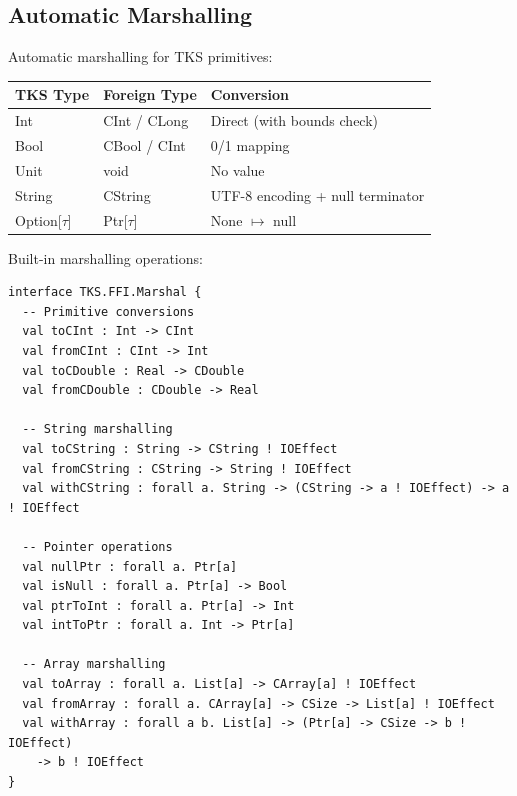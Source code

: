 \subsection{Automatic Marshalling}
\label{subsec:auto-marshalling}

\begin{definition}
\label{def:primitive-mapping}
Automatic marshalling for TKS primitives:
\begin{center}
\begin{tabular}{lll}
\toprule
\textbf{TKS Type} & \textbf{Foreign Type} & \textbf{Conversion} \\
\midrule
\textsf{Int} & \textsf{CInt} / \textsf{CLong} & Direct (with bounds check) \\
\textsf{Bool} & \textsf{CBool} / \textsf{CInt} & 0/1 mapping \\
\textsf{Unit} & \textsf{void} & No value \\
\textsf{String} & \textsf{CString} & UTF-8 encoding + null terminator \\
\textsf{Option}[$\tau$] & \textsf{Ptr}[$\tau$] & \textsf{None} $\mapsto$ null \\
\bottomrule
\end{tabular}
\end{center}
\end{definition}

\begin{definition}
\label{def:marshalling-fns}
Built-in marshalling operations:
\begin{verbatim}
interface TKS.FFI.Marshal {
  -- Primitive conversions
  val toCInt : Int -> CInt
  val fromCInt : CInt -> Int
  val toCDouble : Real -> CDouble
  val fromCDouble : CDouble -> Real

  -- String marshalling
  val toCString : String -> CString ! IOEffect
  val fromCString : CString -> String ! IOEffect
  val withCString : forall a. String -> (CString -> a ! IOEffect) -> a ! IOEffect

  -- Pointer operations
  val nullPtr : forall a. Ptr[a]
  val isNull : forall a. Ptr[a] -> Bool
  val ptrToInt : forall a. Ptr[a] -> Int
  val intToPtr : forall a. Int -> Ptr[a]

  -- Array marshalling
  val toArray : forall a. List[a] -> CArray[a] ! IOEffect
  val fromArray : forall a. CArray[a] -> CSize -> List[a] ! IOEffect
  val withArray : forall a b. List[a] -> (Ptr[a] -> CSize -> b ! IOEffect)
    -> b ! IOEffect
}
\end{verbatim}
\end{definition}

